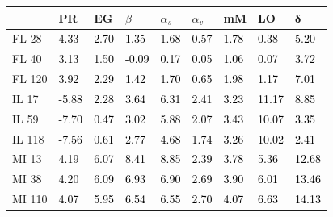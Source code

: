 \begin{tabular}{lllllllll}
\toprule
 & PR & EG & $β$ & $α_s$ & $α_v$ & mM & LO & δ \\
\midrule
FL 28 & \textcolor{black}{ 4.33 } & \textcolor{black}{ 2.70 } & \textcolor{black}{ 1.35 } & \textcolor{black}{ 1.68 } & \textcolor{black}{ 0.57 } & \textcolor{black}{ 1.78 } & \textcolor{black}{ 0.38 } & \textcolor{black}{ 5.20 } \\
FL 40 & \textcolor{black}{ 3.13 } & \textcolor{black}{ 1.50 } & \textcolor{black}{ -0.09 } & \textcolor{black}{ 0.17 } & \textcolor{black}{ 0.05 } & \textcolor{black}{ 1.06 } & \textcolor{black}{ 0.07 } & \textcolor{black}{ 3.72 } \\
FL 120 & \textcolor{black}{ 3.92 } & \textcolor{black}{ 2.29 } & \textcolor{black}{ 1.42 } & \textcolor{black}{ 1.70 } & \textcolor{black}{ 0.65 } & \textcolor{black}{ 1.98 } & \textcolor{black}{ 1.17 } & \textcolor{black}{ 7.01 } \\
IL 17 & \textcolor{black}{ -5.88 } & \textcolor{black}{ 2.28 } & \textcolor{black}{ 3.64 } & \textcolor{black}{ 6.31 } & \textcolor{black}{ 2.41 } & \textcolor{black}{ 3.23 } & \textcolor{black}{ 11.17 } & \textcolor{black}{ 8.85 } \\
IL 59 & \textcolor{black}{ -7.70 } & \textcolor{black}{ 0.47 } & \textcolor{black}{ 3.02 } & \textcolor{black}{ 5.88 } & \textcolor{black}{ 2.07 } & \textcolor{black}{ 3.43 } & \textcolor{black}{ 10.07 } & \textcolor{black}{ 3.35 } \\
IL 118 & \textcolor{black}{ -7.56 } & \textcolor{black}{ 0.61 } & \textcolor{black}{ 2.77 } & \textcolor{black}{ 4.68 } & \textcolor{black}{ 1.74 } & \textcolor{black}{ 3.26 } & \textcolor{black}{ 10.02 } & \textcolor{black}{ 2.41 } \\
MI 13 & \textcolor{black}{ 4.19 } & \textcolor{black}{ 6.07 } & \textcolor{black}{ 8.41 } & \textcolor{black}{ 8.85 } & \textcolor{black}{ 2.39 } & \textcolor{black}{ 3.78 } & \textcolor{black}{ 5.36 } & \textcolor{black}{ 12.68 } \\
MI 38 & \textcolor{black}{ 4.20 } & \textcolor{black}{ 6.09 } & \textcolor{black}{ 6.93 } & \textcolor{black}{ 6.90 } & \textcolor{black}{ 2.69 } & \textcolor{black}{ 3.90 } & \textcolor{black}{ 6.01 } & \textcolor{black}{ 13.46 } \\
MI 110 & \textcolor{black}{ 4.07 } & \textcolor{black}{ 5.95 } & \textcolor{black}{ 6.54 } & \textcolor{black}{ 6.55 } & \textcolor{black}{ 2.70 } & \textcolor{black}{ 4.07 } & \textcolor{black}{ 6.63 } & \textcolor{black}{ 14.13 } \\

\end{tabular}
